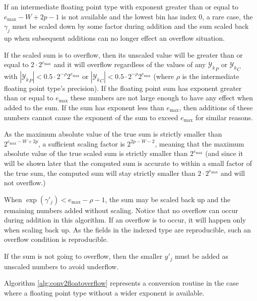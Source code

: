     If an intermediate floating point type with exponent greater than or equal
    to $e_{\max} - W + 2  p - 1$ is not available and the lowest bin has index
    0, a rare case, the $\gamma_j$ must be scaled down by some factor during
    addition and the sum scaled back up when subsequent additions can no longer
    effect an overflow situation.

    If the scaled sum is to overflow, then its unscaled value will be greater
    than or equal to $2 \cdot 2^{e_{\max}}$ and it will overflow regardless of
    the values of any ${\mathcal{Y}_k}_P$ or ${\mathcal{Y}_k}_C$ with
    $|{\mathcal{Y}_k}_P| < 0.5 \cdot 2^{-\rho} 2^{e_{\max}}$ or
    $|{\mathcal{Y}_k}_C| < 0.5 \cdot 2^{-\rho}2^{e_{\max}}$ (where $\rho$ is
    the intermediate floating point type's precision). If the floating point
    sum has exponent greater than or equal to $e_{\max}$ these numbers are not
    large enough to have any effect when added to the sum. If the sum has
    exponent less than $e_{\max}$, then additions of these numbers cannot cause
    the exponent of the sum to exceed $e_{\max}$ for similar reasons.

    As the maximum absolute value of the true sum is strictly smaller than
    $2^{e_{\max} - W + 2 p}$, a sufficient scaling factor is $2^{2p-W-2}$,
    meaning that the maximum absolute value of the true scaled sum is
    strictly smaller than $2^{e_{\max}}$ (and since it will be shown
    later that the computed sum is accurate to within a small factor of the
    true sum, the computed sum will stay strictly smaller than $2 \cdot
    2^{e_{\max}}$ and will not overflow.)

    When $\exp(\gamma'_j) < e_{\max} - \rho - 1$, the sum may be scaled back up
    and the remaining numbers added without scaling. Notice that no overflow
    can occur during addition in this algorithm. If an overflow is to occur, it
    will happen only when scaling back up. As the fields in the indexed type
    are reproducible, such an overflow condition is reproducible.

    If the sum is not going to overflow, then the smaller $y'_j$ must be added
    as unscaled numbers to avoid underflow.

    Algorithm \ref{alg:conv2floatoverflow} represents a conversion routine in the case where a floating point type without a wider exponent is available.

